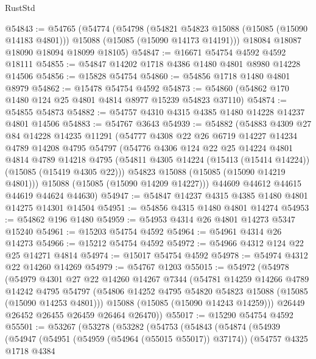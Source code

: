 \begin{lexlean}{RustStd}
\begin{coremodule}
@54843 := @54765
    (@54774
      (@54798
        (@54821 @54823 @15088 (@15085 (@15090 @14183 @4801)))
        @15088
        (@15085 (@15090 @14173 @14191)))
      @18084
      @18087
      @18090
      @18094
      @18099
      @18105)
@54847 := @16671 @54754 @4592 @4592 @18111
@54855 := @54847 @14202 @1718 @4386 @1480 @4801 @8980 @14228 @14506
@54856 := @15828 @54754
@54860 := @54856 @1718 @1480 @4801 @8979
@54862 := @15478 @54754 @4592
@54873 := @54860 (@54862 @170 @1480 @124 @25 @4801 @4814 @8977 @15239 @54823 @37110)
@54874 := @54855 @54873
@54882 := @54757 @4310 @4315 @4385 @1480 @14228 @14237 @4801 @14506
@54883 := @54767 @3643
@54939 := @54882
    (@54883
      @4309
      @27
      @84
      @14228
      @14235
      @11291
      (@54777
        @4308
        @22
        @26
        @6719
        @14227
        @14234
        @4789
        @14208
        @4795
        @54797
        (@54776
          @4306
          @124
          @22
          @25
          @14224
          @4801
          @4814
          @4789
          @14218
          @4795
          (@54811 @4305 @14224 (@15413 (@15414 @14224)) (@15085 (@15419 @4305 @22)))
          @54823
          @15088
          (@15085 (@15090 @14219 @4801)))
        @15088
        (@15085 (@15090 @14209 @14227)))
      @44609
      @44612
      @44615
      @44619
      @44624
      @44630)
@54947 := @54847 @14237 @4315 @4385 @1480 @4801 @14275 @14301 @14504
@54951 := @54856 @4315 @1480 @4801 @14274
@54953 := @54862 @196 @1480
@54959 := @54953 @4314 @26 @4801 @14273 @5347 @15240
@54961 := @15203 @54754 @4592
@54964 := @54961 @4314 @26 @14273
@54966 := @15212 @54754 @4592
@54972 := @54966 @4312 @124 @22 @25 @14271 @4814
@54974 := @15017 @54754 @4592
@54978 := @54974 @4312 @22 @14260 @14269
@54979 := @54767 @1203
@55015 := @54972
    (@54978
      (@54979
        @4301
        @27
        @22
        @14260
        @14267
        @7344
        (@54781
          @14259
          @14266
          @4789
          @14242
          @4795
          @54797
          (@54806 @14252 @4795 @54820 @54823 @15088 (@15085 (@15090 @14253 @4801)))
          @15088
          (@15085 (@15090 @14243 @14259)))
        @26449
        @26452
        @26455
        @26459
        @26464
        @26470))
@55017 := @15290 @54754 @4592
@55501 := @53267
    (@53278
      (@53282
        (@54753
          (@54843
            (@54874
              (@54939
                (@54947
                  (@54951 (@54959 (@54964 (@55015 @55017)) @37174))
                  (@54757
                    @4325
                    @1718
                    @4384

\end{coremodule}
\end{lexlean}
